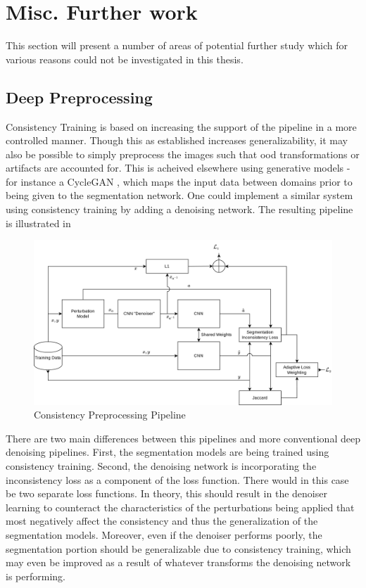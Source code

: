 \section{Misc. Further work}
  This section will present a number of areas of potential further study which for various reasons could not be investigated in this thesis. 
    \subsection{Deep Preprocessing} \label{denoising}
        Consistency Training is based on increasing the support of the pipeline in a more controlled manner. Though this as established increases generalizability, it may also be possible to simply preprocess the images such that \gls{ood} transformations or artifacts are accounted for. This is acheived elsewhere using generative models - for instance a CycleGAN \cite{cyclegan}, which maps the input data between domains prior to being given to the segmentation network. One could implement a similar system using consistency training by adding a denoising network. The resulting pipeline is illustrated in 
        
        \begin{figure}
            \centering
           \includegraphics[width=\linewidth]{illustrations/deep_preprocessing.png}
            \caption{Consistency Preprocessing Pipeline}
            \label{fig:preproc}
        \end{figure}
        
        There are two main differences between this pipelines and more conventional deep denoising pipelines. First, the segmentation models are being trained using consistency training. Second, the denoising network is incorporating the inconsistency loss as a component of the loss function. There would in this case be two separate loss functions. In theory, this should result in the denoiser learning to counteract the characteristics of the perturbations being applied that most negatively affect the consistency and thus the generalization of the segmentation models. Moreover, even if the denoiser performs poorly, the segmentation portion should be generalizable due to consistency training, which may even be improved as a result of whatever transforms the denoising network is performing.
        
